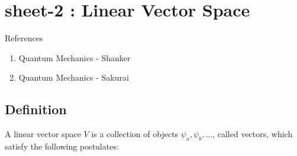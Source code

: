 
\chapter{sheet-2 : Linear Vector Space}
References
\begin{enumerate}
	\item 
	Quantum Mechanics	-	Shanker
	
	\item
	Quantum Mechanics	- Sakurai
\end{enumerate}

\section{Definition}
A linear vector space $V$ is a collection of objects $\psi_a, \psi_b, \ldots$, called vectors, which satisfy the following postulates:
